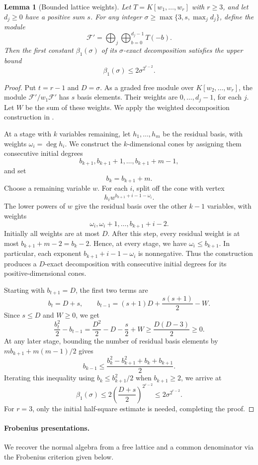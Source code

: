 \documentclass[12pt]{amsart}
\numberwithin{equation}{section}
\newtheorem{lemma}[theorem]{Lemma}
\theoremstyle{definition}
\theoremstyle{remark}
\numberwithin{equation}{section}
\begin{document}
\begin{lemma}[Bounded lattice weights]
\label{lem:boundedweights-macaulay}
Let $T=K[w_1,\ldots,w_r]$ with $r\ge3$, and let $d_j\ge0$ have a positive sum $s$. For any integer $\sigma\ge\max\{3,s,\max_j d_j\}$, define the module
\[
\mathcal{F}'=\bigoplus_j\bigoplus_{b=0}^{d_j-1}T(-b).
\]
 Then the first constant $\beta_1(\sigma)$ of its $\sigma$-exact decomposition satisfies the upper bound
\[
\beta_1(\sigma)\le2\sigma^{2^{r-2}}.
\]
\end{lemma}
\begin{proof}
Put $t=r-1$ and $D=\sigma$. As a graded free module over $K[w_2,\ldots,w_r]$, the module $\mathcal F'/w_1\mathcal F'$ has $s$ basis elements.
Their weights are $0,\ldots,d_j-1$, for each $j$. Let $W$ be the sum of these weights.
We apply the weighted decomposition construction in \cite[Lemma~34]{Liang}.

At a stage with $k$ variables remaining, let $h_1,\ldots,h_m$ be the residual basis, with weights $\omega_i=\deg h_i$.
We construct the $k$-dimensional cones by assigning them consecutive initial degrees
\[
 b_{k+1},b_{k+1}+1,\ldots,b_{k+1}+m-1,
\]
and set
\[
 b_k=b_{k+1}+m.
\]
Choose a remaining variable $w$. For each $i$, split off the cone with vertex
\[
 h_iw^{b_{k+1}+i-1-\omega_i}.
\]
The lower powers of $w$ give the residual basis over the other $k-1$ variables, with weights
\[
 \omega_i,\omega_i+1,\ldots,b_{k+1}+i-2.
\]
Initially all weights are at most $D$. After this step, every residual weight is at most $b_{k+1}+m-2=b_k-2$.
Hence, at every stage, we have $\omega_i\le b_{k+1}$. In particular, each exponent $b_{k+1}+i-1-\omega_i$ is nonnegative.
 Thus the construction produces a $D$-exact decomposition with consecutive initial degrees for its positive-dimensional cones.


Starting with $b_{t+1}=D$, the first two terms are
\[
 b_t=D+s,\qquad b_{t-1}=(s+1)D+\frac{s(s+1)}2-W.
\]
Since $s\le D$ and $W\ge0$, we get
\[
 \frac{b_t^2}{2}-b_{t-1}=\frac{D^2}{2}-D-\frac s2+W\ge\frac{D(D-3)}2\ge0.
\]
 At any later stage, bounding the number of residual basis elements by $mb_{k+1} + m(m-1)/2$ gives
 \[
 b_{k-1}\le\frac{b_k^2-b_{k+1}^2+b_k+b_{k+1}}2.
\]
Iterating this inequality using $b_k\le b_{k+1}^2/2$ when $b_{k+1}\ge2$, we arrive at
\[
\beta_1(\sigma) \le 2\left(\frac{D+s}{2}\right)^{2^{r-2}} \le 2\sigma^{2^{r-2}}.
\]
For $r=3$, only the initial half-square estimate is needed, completing the proof.
\end{proof}

\paragraph{\textbf{Frobenius presentations.}}
We recover the normal algebra from a free lattice and a common denominator via the Frobenius criterion given below.
\end{document}
